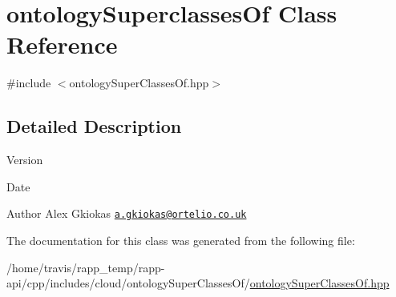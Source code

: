 \hypertarget{classontologySuperclassesOf}{\section{ontology\-Superclasses\-Of Class Reference}
\label{classontologySuperclassesOf}
}


{\ttfamily \#include $<$ontology\-Super\-Classes\-Of.\-hpp$>$}



\subsection{Detailed Description}
\begin{DoxyVersion}{Version}

\end{DoxyVersion}
\begin{DoxyDate}{Date}

\end{DoxyDate}
\begin{DoxyAuthor}{Author}
Alex Gkiokas \href{mailto:a.gkiokas@ortelio.co.uk}{\tt a.\-gkiokas@ortelio.\-co.\-uk} 
\end{DoxyAuthor}


The documentation for this class was generated from the following file\-:\begin{DoxyCompactItemize}
\item 
/home/travis/rapp\-\_\-temp/rapp-\/api/cpp/includes/cloud/ontology\-Super\-Classes\-Of/\hyperlink{ontologySuperClassesOf_8hpp}{ontology\-Super\-Classes\-Of.\-hpp}\end{DoxyCompactItemize}
